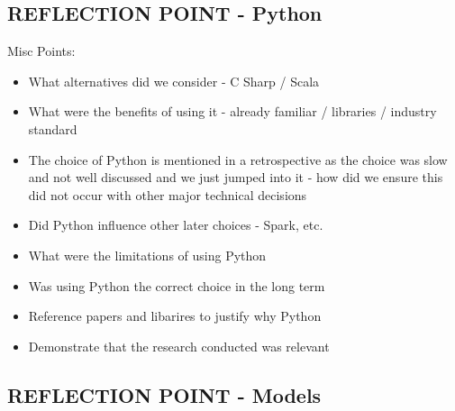 \documentclass{l3proj}
\begin{document}
\subsection{REFLECTION POINT - Python}
\label{sec:pyreflection}

Misc Points:
\begin{itemize}
\item What alternatives did we consider - C Sharp / Scala
\item What were the benefits of using it - already familiar / libraries / industry standard
\item The choice of Python is mentioned in a retrospective as the choice was slow and not well discussed and we just jumped into it - how did we ensure this did not occur with other major technical decisions
\item Did Python influence other later choices - Spark, etc.
\item What were the limitations of using Python
\item Was using Python the correct choice in the long term 
\item Reference papers and libarires to justify why Python 
\item Demonstrate that the research conducted was relevant
\end{itemize}


\subsection{REFLECTION POINT - Models}
\label{sec:modelreflection}
\end{document}

